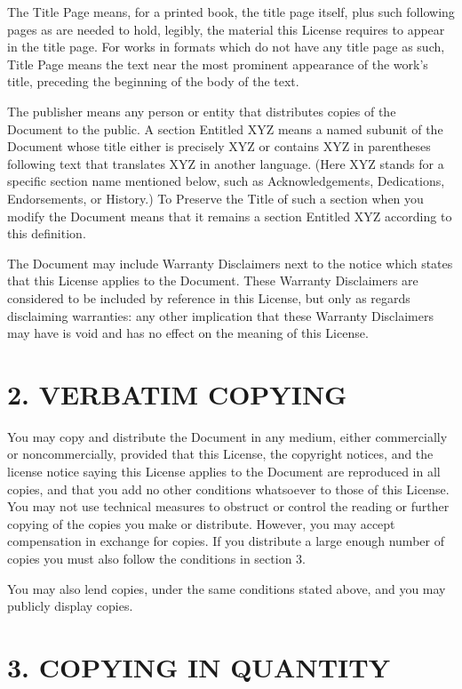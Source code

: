 \documentclass[captions=tableheading]{scrbook}
\begin{document}
The Title Page means, for a printed book, the title page itself, plus such following pages as are needed to hold, legibly, the material this License requires to appear in the title page. For works in formats which do not have any title page as such, Title Page means the text near the most prominent appearance of the work's title, preceding the beginning of the body of the text.

The publisher means any person or entity that distributes copies of the Document to the public.  A section Entitled XYZ means a named subunit of the Document whose title either is precisely XYZ or contains XYZ in parentheses following text that translates XYZ in another language. (Here XYZ stands for a specific section name mentioned below, such as Acknowledgements, Dedications, Endorsements, or History.) To Preserve the Title of such a section when you modify the Document means that it remains a section Entitled XYZ according to this definition.

The Document may include Warranty Disclaimers next to the notice which states that this License applies to the Document. These Warranty Disclaimers are considered to be included by reference in this License, but only as regards disclaiming warranties: any other implication that these Warranty Disclaimers may have is void and has no effect on the meaning of this License.
\section{2. VERBATIM COPYING}
\label{sec-3-3}


You may copy and distribute the Document in any medium, either commercially or noncommercially, provided that this License, the copyright notices, and the license notice saying this License applies to the Document are reproduced in all copies, and that you add no other conditions whatsoever to those of this License. You may not use technical measures to obstruct or control the reading or further copying of the copies you make or distribute. However, you may accept compensation in exchange for copies. If you distribute a large enough number of copies you must also follow the conditions in section 3.

You may also lend copies, under the same conditions stated above, and you may publicly display copies.
\section{3. COPYING IN QUANTITY}
\label{sec-3-4}
\end{document}

